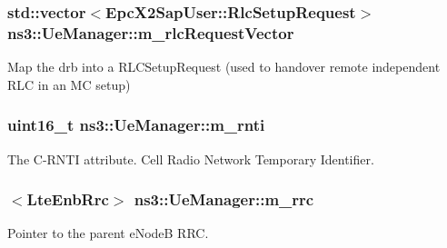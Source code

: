 \subsubsection[{\texorpdfstring{m\+\_\+rlc\+Request\+Vector}{m_rlcRequestVector}}]{\setlength{\rightskip}{0pt plus 5cm}std\+::vector$<${\bf Epc\+X2\+Sap\+User\+::\+Rlc\+Setup\+Request}$>$ ns3\+::\+Ue\+Manager\+::m\+\_\+rlc\+Request\+Vector\hspace{0.3cm}{\ttfamily [private]}}\hypertarget{classns3_1_1UeManager_a998bc5ed29bd7edfa4c683adcfc7cabb}{}\label{classns3_1_1UeManager_a998bc5ed29bd7edfa4c683adcfc7cabb}
Map the drb into a R\+L\+C\+Setup\+Request (used to handover remote independent R\+LC in an MC setup) 
\subsubsection[{\texorpdfstring{m\+\_\+rnti}{m_rnti}}]{\setlength{\rightskip}{0pt plus 5cm}uint16\+\_\+t ns3\+::\+Ue\+Manager\+::m\+\_\+rnti\hspace{0.3cm}{\ttfamily [private]}}\hypertarget{classns3_1_1UeManager_a5a72b4fe818f21993bd7f05d7e2c4f83}{}\label{classns3_1_1UeManager_a5a72b4fe818f21993bd7f05d7e2c4f83}
The {\ttfamily C-\/\+R\+N\+TI} attribute. Cell Radio Network Temporary Identifier. 
\subsubsection[{\texorpdfstring{m\+\_\+rrc}{m_rrc}}]{$<${\bf Lte\+Enb\+Rrc}$>$ ns3\+::\+Ue\+Manager\+::m\+\_\+rrc\hspace{0.3cm}{\ttfamily [private]}}\hypertarget{classns3_1_1UeManager_ab4405e9f354c66e7c1a4c95832290f5b}{}\label{classns3_1_1UeManager_ab4405e9f354c66e7c1a4c95832290f5b}


Pointer to the parent e\+NodeB R\+RC. 

